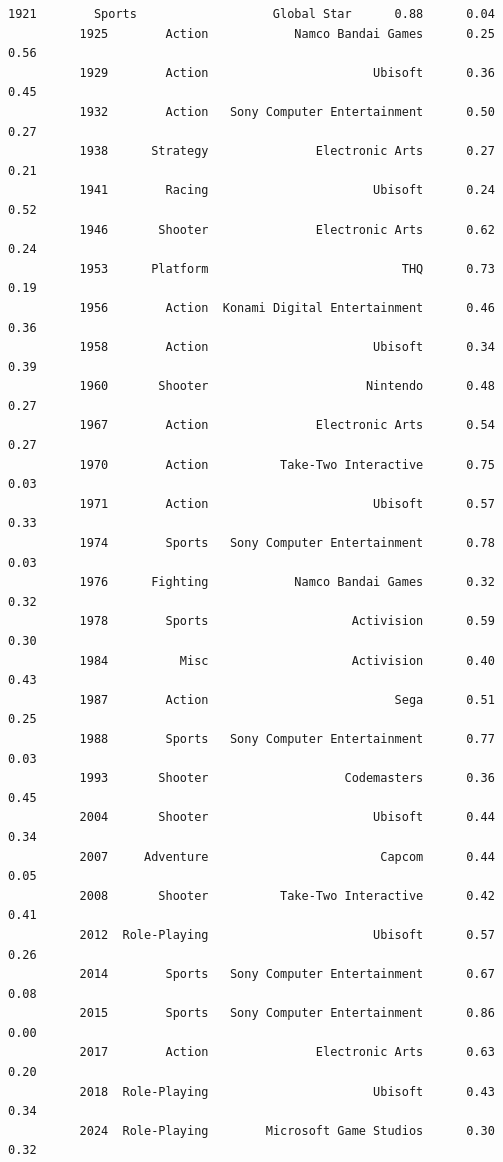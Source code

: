 \documentclass[11pt]{article}
\begin{document}
\begin{Verbatim}[commandchars=\\\{\}]
          1921        Sports                   Global Star      0.88      0.04   
          1925        Action            Namco Bandai Games      0.25      0.56   
          1929        Action                       Ubisoft      0.36      0.45   
          1932        Action   Sony Computer Entertainment      0.50      0.27   
          1938      Strategy               Electronic Arts      0.27      0.21   
          1941        Racing                       Ubisoft      0.24      0.52   
          1946       Shooter               Electronic Arts      0.62      0.24   
          1953      Platform                           THQ      0.73      0.19   
          1956        Action  Konami Digital Entertainment      0.46      0.36   
          1958        Action                       Ubisoft      0.34      0.39   
          1960       Shooter                      Nintendo      0.48      0.27   
          1967        Action               Electronic Arts      0.54      0.27   
          1970        Action          Take-Two Interactive      0.75      0.03   
          1971        Action                       Ubisoft      0.57      0.33   
          1974        Sports   Sony Computer Entertainment      0.78      0.03   
          1976      Fighting            Namco Bandai Games      0.32      0.32   
          1978        Sports                    Activision      0.59      0.30   
          1984          Misc                    Activision      0.40      0.43   
          1987        Action                          Sega      0.51      0.25   
          1988        Sports   Sony Computer Entertainment      0.77      0.03   
          1993       Shooter                   Codemasters      0.36      0.45   
          2004       Shooter                       Ubisoft      0.44      0.34   
          2007     Adventure                        Capcom      0.44      0.05   
          2008       Shooter          Take-Two Interactive      0.42      0.41   
          2012  Role-Playing                       Ubisoft      0.57      0.26   
          2014        Sports   Sony Computer Entertainment      0.67      0.08   
          2015        Sports   Sony Computer Entertainment      0.86      0.00   
          2017        Action               Electronic Arts      0.63      0.20   
          2018  Role-Playing                       Ubisoft      0.43      0.34   
          2024  Role-Playing        Microsoft Game Studios      0.30      0.32   
          

\end{Verbatim}
\end{document}
